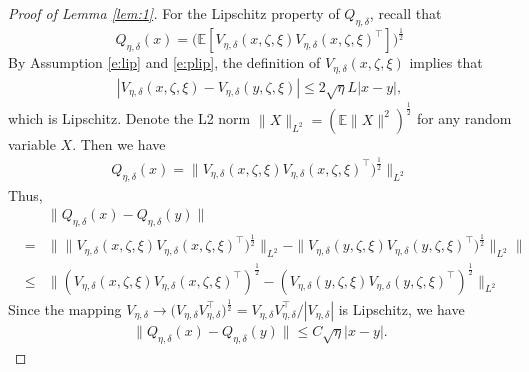 \documentclass[12pt]{amsart}
\theoremstyle{definition}
\theoremstyle{remark}
\numberwithin{equation}{section}
\newcommand{\E}{\mathbb{E}}            %
\begin{document}
\begin{appendix}
\begin{proof}[Proof of Lemma \ref{lem:1}]
	For the Lipschitz property of $Q_{\eta,\delta}$, recall that	
	\begin{equation*}
		Q_{\eta,\delta}(x)=\big(\E[V_{\eta,\delta}(x,\zeta,\xi)V_{\eta,\delta}(x,\zeta,\xi)^\top]\big)^{\frac12}
	\end{equation*}
	By Assumption \ref{e:lip} and \ref{e:plip}, the definition of $V_{\eta,\delta}(x,\zeta,\xi)$ implies that
	\begin{eqnarray*}
		|V_{\eta,\delta}(x,\zeta,\xi)-V_{\eta,\delta}(y,\zeta,\xi)|\le 2\sqrt\eta L|x-y|,	
	\end{eqnarray*}
	which is Lipschitz. Denote the L2 norm $\|X\|_{L^2}=(\E\|X\|^2)^{\frac12}$ for any random variable $X$. Then we have
	\begin{eqnarray*}
		Q_{\eta,\delta}(x)=\| V_{\eta,\delta}(x,\zeta,\xi)V_{\eta,\delta}(x,\zeta,\xi)^\top)^{\frac12}  \|_{L^2}
	\end{eqnarray*}
	Thus,
	\begin{eqnarray*}
		&&\|Q_{\eta,\delta}(x)-Q_{\eta,\delta}(y)\|\\
		&=&\big\| \| V_{\eta,\delta}(x,\zeta,\xi)V_{\eta,\delta}(x,\zeta,\xi)^\top)^{\frac12}  \|_{L^2}-\| V_{\eta,\delta}(y,\zeta,\xi)V_{\eta,\delta}(y,\zeta,\xi)^\top)^{\frac12}  \|_{L^2}   \big\|\\
		&\le&\| ( V_{\eta,\delta}(x,\zeta,\xi)V_{\eta,\delta}(x,\zeta,\xi)^\top)^{\frac12}  - (V_{\eta,\delta}(y,\zeta,\xi)V_{\eta,\delta}(y,\zeta,\xi)^\top)^{\frac12}  \|_{L^2}   
	\end{eqnarray*}
	Since the mapping $V_{\eta,\delta}\to \big(V_{\eta,\delta}V_{\eta,\delta}^\top \big)^{\frac12}=V_{\eta,\delta}V_{\eta,\delta}^\top/|V_{\eta,\delta}|$ is Lipschitz, we have
	\begin{eqnarray*}
		\|Q_{\eta,\delta}(x)-Q_{\eta,\delta}(y)\|\le C\sqrt \eta |x-y|.
	\end{eqnarray*}
\end{proof}


\end{appendix}
\end{document}
